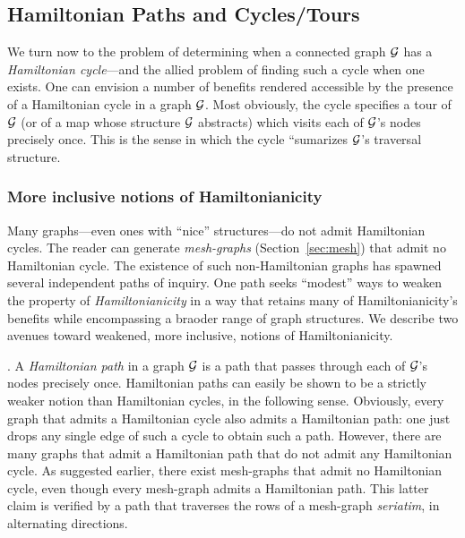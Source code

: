 
\subsection{Hamiltonian Paths and Cycles/Tours}
\label{sec:Hamiltonian-cycle}

We turn now to the problem of determining when a connected graph $\mbox{$\cal G$}$
has a {\it Hamiltonian cycle}---and the allied problem of finding such
a cycle when one exists.  One can envision a number of benefits
rendered accessible by the presence of a Hamiltonian cycle in a graph
$\mbox{$\cal G$}$.  Most obviously, the cycle specifies a tour of $\mbox{$\cal G$}$ (or of a map
whose structure $\mbox{$\cal G$}$ abstracts) which visits each of $\mbox{$\cal G$}$'s nodes
precisely once.  This is the sense in which the cycle ``sumarizes
$\mbox{$\cal G$}$'s traversal structure.

\subsubsection{More inclusive notions of Hamiltonianicity}

Many graphs---even ones with ``nice'' structures---do not admit
Hamiltonian cycles.  The reader can generate {\it mesh-graphs}
(Section~\ref{sec:mesh}) that admit no Hamiltonian cycle.  The
existence of such non-Hamiltonian graphs has spawned several
independent paths of inquiry.  One path seeks ``modest'' ways to
weaken the property of {\it Hamiltonianicity}
 in a way that retains many of
Hamiltonianicity's benefits while encompassing a braoder range of
graph structures.  We describe two avenues toward weakened, more
inclusive, notions of Hamiltonianicity.

.
A {\it Hamiltonian path} 
 in a graph $\mbox{$\cal G$}$ is a path that passes through
each of $\mbox{$\cal G$}$'s nodes precisely once.  Hamiltonian paths can easily be
shown to be a strictly weaker notion than Hamiltonian cycles, in the
following sense.  Obviously, every graph that admits a Hamiltonian
cycle also admits a Hamiltonian path: one just drops any single edge
of such a cycle to obtain such a path.  However, there are many graphs
that admit a Hamiltonian path that do not admit any Hamiltonian cycle.
As suggested earlier, there exist mesh-graphs that admit no
Hamiltonian cycle, even though every mesh-graph admits a Hamiltonian
path.  This latter claim is verified by a path that traverses the rows
of a mesh-graph {\it seriatim}, in alternating directions.

